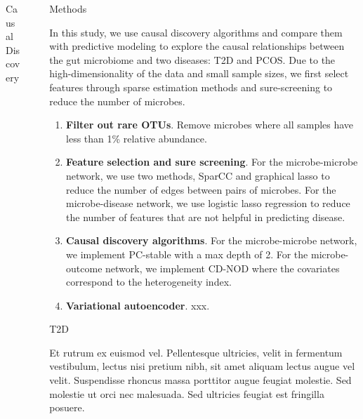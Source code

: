 \documentclass[final]{beamer}
\newlength{\sepwidth}
\newlength{\colwidth}
\newcommand{\separatorcolumn}{\begin{column}{\sepwidth}\end{column}}
\begin{document}
\begin{frame}[t]
\begin{columns}[t]
\begin{column}{\colwidth}
\begin{alertblock}{Causal Discovery}
	  \end{alertblock}

\end{column}

\separatorcolumn

\begin{column}{\colwidth}

  \begin{block}{Methods}

   In this study, we use causal discovery algorithms and compare them with 
   predictive modeling to explore the causal relationships between the 
   gut microbiome and two diseases: T2D and PCOS. Due to the high-dimensionality
   of the data and small sample sizes, we first select features through sparse
   estimation methods and sure-screening to reduce the number of microbes. 

    \begin{enumerate}
      \item \textbf{Filter out rare OTUs}. Remove microbes where all samples have less than 1\%
      relative abundance. 
      \item \textbf{Feature selection and sure screening}. For the microbe-microbe network, we use two 
      methods, SparCC and graphical lasso to reduce the number of edges between pairs of microbes.
      For the microbe-disease network, we use logistic lasso regression to reduce the number of 
      features that are not helpful in predicting disease. 
      \item \textbf{Causal discovery algorithms}. For the microbe-microbe network, we implement
      PC-stable with a max depth of 2. For the microbe-outcome network, we implement CD-NOD
      where the covariates correspond to the heterogeneity index. 
      \item \textbf{Variational autoencoder}. xxx. 
    \end{enumerate}

  \end{block}

  \begin{block}{T2D}

    Et rutrum ex euismod vel. Pellentesque ultricies, velit in fermentum
    vestibulum, lectus nisi pretium nibh, sit amet aliquam lectus augue vel
    velit. Suspendisse rhoncus massa porttitor augue feugiat molestie. Sed
    molestie ut orci nec malesuada. Sed ultricies feugiat est fringilla
    posuere.


\end{block}
\end{column}
\end{columns}
\end{frame}
\end{document}
